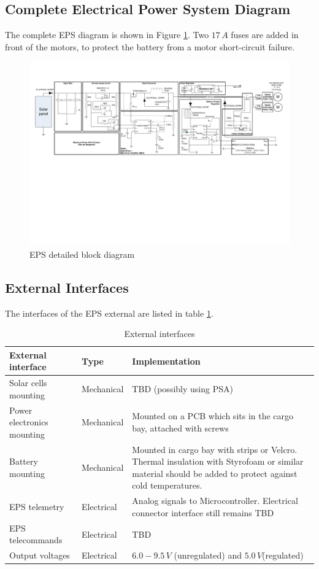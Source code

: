 \subsection{Complete Electrical Power System Diagram}
%
The complete \ac{EPS} diagram is shown in Figure \ref{fig:EPS_diagram_detailed}. Two $17\,A$ fuses are added in front of the motors, to protect the battery from a motor short-circuit failure.
%
\begin{figure}
\centering
\includegraphics[width=\textwidth]{figures/fig_CDR_EPSdiagram_detailed}
\caption{EPS detailed block diagram}
\label{fig:EPS_diagram_detailed}
\end{figure}

%
\subsection{External Interfaces}
%
The interfaces of the \ac{EPS} external are listed in table \ref{tab:external_interfaces}.
%
\begin{table}[H]
\centering
\caption{External interfaces}
\label{tab:external_interfaces}
\begin{tabular}{m{}m{}m{}}
\hline
\textbf{External interface} & \textbf{Type} & \textbf{Implementation}\\
\hline
Solar cells mounting & Mechanical & \ac{TBD} (possibly using \ac{PSA})\\[2mm]
Power electronics mounting & Mechanical & Mounted on a \ac{PCB} which sits in the cargo bay, attached with screws\\[2mm]
Battery mounting & Mechanical & Mounted in cargo bay with strips or Velcro. Thermal insulation with Styrofoam or similar material should be added to protect against cold temperatures.\\[2mm]
\ac{EPS} telemetry & Electrical & Analog signals to Microcontroller. Electrical connector interface still remains \ac{TBD}\\[2mm]
\ac{EPS} telecommands & Electrical & \ac{TBD}\\[2mm]
Output voltages & Electrical & $6.0-9.5\,V$ (unregulated) and $5.0\,V$(regulated)\\[2mm]
\hline
\end{tabular}
\end{table}
%
%
